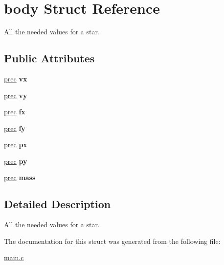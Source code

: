 \hypertarget{structbody}{\section{body Struct Reference}
\label{structbody}
}


All the needed values for a star.  


\subsection*{Public Attributes}
\begin{DoxyCompactItemize}
\item 
\hypertarget{structbody_ac1c2c2638fa04dcc32b415e5a95fd014}{\hyperlink{main_8c_a4c01dcca324ecd28bf0f7dbd30b6c007}{prec} {\bfseries vx}}\label{structbody_ac1c2c2638fa04dcc32b415e5a95fd014}

\item 
\hypertarget{structbody_ac4292fdebf4f4574ec3225b3c30fcbba}{\hyperlink{main_8c_a4c01dcca324ecd28bf0f7dbd30b6c007}{prec} {\bfseries vy}}\label{structbody_ac4292fdebf4f4574ec3225b3c30fcbba}

\item 
\hypertarget{structbody_a909a3dc9f1de52d6eae67d50811904eb}{\hyperlink{main_8c_a4c01dcca324ecd28bf0f7dbd30b6c007}{prec} {\bfseries fx}}\label{structbody_a909a3dc9f1de52d6eae67d50811904eb}

\item 
\hypertarget{structbody_ad291de8c41a0825e596f21869606e984}{\hyperlink{main_8c_a4c01dcca324ecd28bf0f7dbd30b6c007}{prec} {\bfseries fy}}\label{structbody_ad291de8c41a0825e596f21869606e984}

\item 
\hypertarget{structbody_a935cc33a66accbb73c0c1ec3d65578c8}{\hyperlink{main_8c_a4c01dcca324ecd28bf0f7dbd30b6c007}{prec} {\bfseries px}}\label{structbody_a935cc33a66accbb73c0c1ec3d65578c8}

\item 
\hypertarget{structbody_a18dab8d128e61877322dbe3b6dc76077}{\hyperlink{main_8c_a4c01dcca324ecd28bf0f7dbd30b6c007}{prec} {\bfseries py}}\label{structbody_a18dab8d128e61877322dbe3b6dc76077}

\item 
\hypertarget{structbody_a6048a9301b93cf013591c86a1f2230af}{\hyperlink{main_8c_a4c01dcca324ecd28bf0f7dbd30b6c007}{prec} {\bfseries mass}}\label{structbody_a6048a9301b93cf013591c86a1f2230af}

\end{DoxyCompactItemize}


\subsection{Detailed Description}
All the needed values for a star. 

The documentation for this struct was generated from the following file\-:\begin{DoxyCompactItemize}
\item 
\hyperlink{main_8c}{main.\-c}\end{DoxyCompactItemize}
